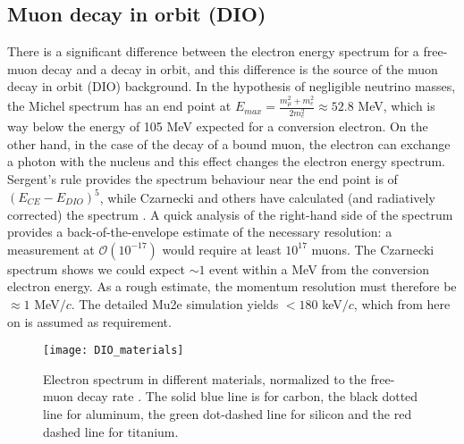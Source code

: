 \documentclass[12pt,a4paper,openright, oneside, titlepage]{book} %
\begin{document}
\subsection{Muon decay in orbit (DIO)}
There is a significant difference between the electron energy spectrum for a free-muon decay and a decay in orbit,
and this difference is the source of the muon decay in orbit (DIO) background.
In the hypothesis of negligible neutrino masses, 
the Michel spectrum has an end point at $E_{max}=\frac{m_\mu^2+m_e^2}{2m_e^2}\approx52.8$ MeV, 
which is way below the energy of 105 MeV expected for a conversion electron.
On the other hand, in the case of the decay of a bound muon, 
the electron can exchange a photon with the nucleus and this effect changes the electron energy spectrum.\\ 
Sergent's rule provides the spectrum behaviour near the end point is of $(E_{CE}-E_{DIO})^5$, 
while Czarnecki and others have calculated (and radiatively corrected) the spectrum \cite{Czarnecki} \cite{Czarnecki2015}.
A quick analysis of the right-hand side of the spectrum provides a back-of-the-envelope estimate 
of the necessary resolution: 
a measurement at $\mathcal{O}(10^{-17})$ would require at least $10^{17}$ muons. 
The Czarnecki spectrum shows we could expect $\sim1$ event within a MeV from the conversion electron energy. 
As a rough estimate, the momentum resolution must therefore be $\approx1$ MeV$/c$. 
The detailed Mu2e simulation yields $<180$ keV$/c$, which from here on is assumed as requirement.\\

\begin{figure}[h!]
\centering
\texttt{[image: DIO\_materials]}
\caption{Electron spectrum in different materials, normalized to the free-muon decay rate \cite{signorelli}. The solid blue line is for carbon, the black dotted line for aluminum, the green dot-dashed line for silicon and the red dashed line for titanium.}
\label{_DIO}
\end{figure}
\end{document}
